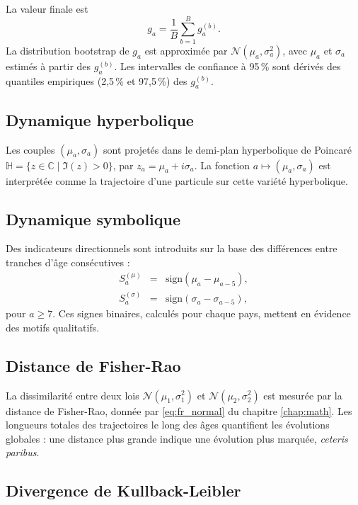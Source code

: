 La valeur finale est
\begin{equation}
g_a = \frac{1}{B} \sum_{b=1}^B g_a^{(b)}.
\end{equation}
La distribution bootstrap de $g_a$ est approximée par $\mathcal{N}(\mu_a, \sigma_a^2)$, avec $\mu_a$ et $\sigma_a$ estimés à partir des $g_a^{(b)}$. Les intervalles de confiance à 95\,\% sont dérivés des quantiles empiriques (2,5\,\% et 97,5\,\%) des $g_a^{(b)}$.

\subsection{Dynamique hyperbolique}

Les couples $(\mu_a, \sigma_a)$ sont projetés dans le demi-plan hyperbolique de Poincaré $\mathbb{H} = \{ z \in \mathbb{C} \mid \Im(z) > 0 \}$, par $z_a = \mu_a + i \sigma_a$. La fonction $a \mapsto (\mu_a, \sigma_a)$ est interprétée comme la trajectoire d'une particule sur cette variété hyperbolique.

\subsection{Dynamique symbolique}

Des indicateurs directionnels sont introduits sur la base des différences entre tranches d'âge consécutives :
\begin{eqnarray}
	S_a^{(\mu)} &=& \mathrm{sign}(\mu_a - \mu_{a-5}), \\
	S_a^{(\sigma)} &=& \mathrm{sign}(\sigma_a - \sigma_{a-5}),
\end{eqnarray}
pour $a \geq 7$. Ces signes binaires, calculés pour chaque pays, mettent en évidence des motifs qualitatifs.

\subsection{Distance de Fisher-Rao}

La dissimilarité entre deux lois $\mathcal{N}(\mu_1, \sigma_1^2)$ et $\mathcal{N}(\mu_2, \sigma_2^2)$ est mesurée par la distance de Fisher-Rao, donnée par \eqref{eq:fr_normal} du chapitre \ref{chap:math}. Les longueurs totales des trajectoires le long des âges quantifient les évolutions globales : une distance plus grande indique une évolution plus marquée, \emph{ceteris paribus}.

\subsection{Divergence de Kullback-Leibler}

